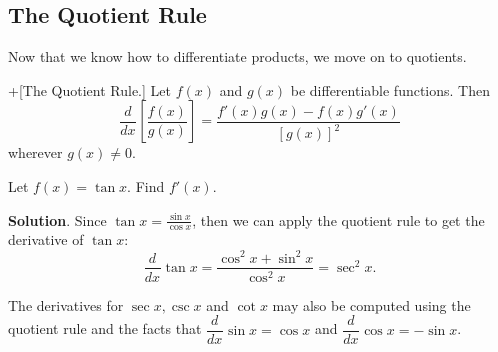 \documentclass[10pt,]{book}
\theoremstyle{ptxplainnotitle}
\theoremstyle{ptxplaintitle}
\theoremstyle{ptxplainnotitle}
\theoremstyle{ptxplaintitle}
\theoremstyle{ptxplainnotitle}
\theoremstyle{ptxplaintitle}
\theoremstyle{ptxdefinitionnotitle}
\theoremstyle{ptxdefinitiontitle}
\theoremstyle{ptxdefinitionnotitle}
\theoremstyle{ptxdefinitiontitle}
\theoremstyle{ptxdefinitionnotitle}
\theoremstyle{ptxdefinitiontitle}
\theoremstyle{ptxdefinitionnotitle}
\theoremstyle{ptxdefinitiontitle}
\theoremstyle{ptxdefinitionnotitle}
\theoremstyle{ptxdefinitiontitle}
\numberwithin{equation}{section}
\newcommand{\dv}[3][]{\dfrac{d^{#1} #2}{d #3^{#1}}}
\begin{document}
\subsection[{The Quotient Rule}]{The Quotient Rule}\label{subsection-the-quotient-rule}
\hypertarget{p-144}{}%
Now that we know how to differentiate products, we move on to quotients.%
\begin{theorem}+[{The Quotient Rule.}]\label{theorem-the-quotient-rule}
\hypertarget{p-145}{}%
Let \(f(x)\) and \(g(x)\) be differentiable functions. Then%
\begin{equation*}
\dv{}{x}\left[\frac{f(x)}{g(x)}\right] = \frac{f'(x)g(x) - f(x)g'(x)}{[g(x)]^{2}}
\end{equation*}
wherever \(g(x)\neq0\).%
\end{theorem}
\begin{example}\label{example-derivative-of-tangent}
\hypertarget{p-146}{}%
Let \(f(x) = \tan x\). Find \(f'(x)\).%
\par\smallskip%
\noindent\textbf{Solution}.\hypertarget{solution-29}{}\quad%
\hypertarget{p-147}{}%
Since \(\tan x = \frac{\sin x}{\cos x}\), then we can apply the quotient rule to get the derivative of \(\tan x\):%
\begin{equation*}
\dv{}{x}\tan x = \frac{\cos^{2}x + \sin^{2}x}{\cos^{2}x} = \sec^{2}x.
\end{equation*}
%
\end{example}
\hypertarget{p-148}{}%
The derivatives for \(\sec x, \csc x\) and \(\cot x\) may also be computed using the quotient rule and the facts that \(\dv{}{x}\sin x = \cos x\) and \(\dv{}{x}\cos x = -\sin x\).%
\typeout{************************************************}
\typeout{************************************************}
\end{document}

